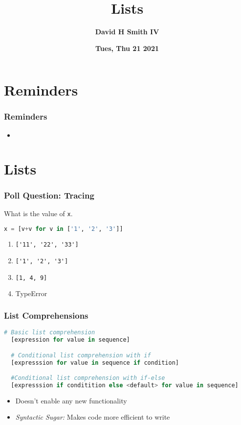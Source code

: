 \documentclass{beamer}
\title{\textbf{Lists}}
\author{\textbf{David H Smith IV}}
\institute[\textbf{UIUC}]{\textbf{University of Illinois Urbana-Champaign}}
\date{\textbf{Tues, Thu 21 2021}}
\begin{document}
\frame{\titlepage}

\section{Reminders}

%
%
\begin{frame}
  \frametitle{Reminders}
  \begin{itemize}
    \item 
  \end{itemize}
\end{frame}

\section{Lists}

%
%
\begin{frame}[fragile]
  \frametitle{Poll Question: Tracing}
  What is the value of \lstinline|x|.
  \begin{lstlisting}[language=Python, autogobble]
  x = [v+v for v in ['1', '2', '3']]
  \end{lstlisting}
  \vfill
  \begin{enumerate}[A]
    \item \lstinline|['11', '22', '33']| 
    \item \lstinline|['1', '2', '3']|
    \item \lstinline|[1, 4, 9]|
    \item TypeError
  \end{enumerate}
\end{frame}

%
%
\begin{frame}[fragile]
  \frametitle{List Comprehensions}
  \begin{lstlisting}[language=Python, autogobble]
  # Basic list comprehension
  [expression for value in sequence]

  # Conditional list comprehension with if
  [expresssion for value in sequence if condition]

  #Conditional list comprehension with if-else
  [expresssion if conditition else <default> for value in sequence]
  \end{lstlisting}
  \vfill
  \begin{itemize}
    \item Doesn't enable any new functionality 
    \item \textit{Syntactic Sugar: } Makes code more efficient to write
  \end{itemize}
\end{frame}
\end{document}
